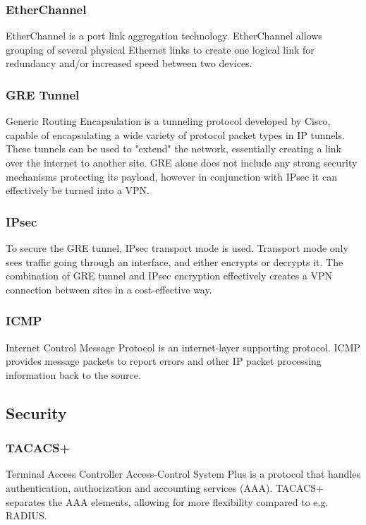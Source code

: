 \subsubsection{EtherChannel}
EtherChannel is a port link aggregation technology. EtherChannel allows grouping of several physical Ethernet links to create one logical link for redundancy and/or increased speed between two devices. \cite{EtherChannel}

\subsubsection{GRE Tunnel}
Generic Routing Encapsulation is a tunneling protocol developed by Cisco, capable of encapsulating a wide variety of protocol packet types in IP tunnels. \cite{CCNP-ROUTE}
These tunnels can be used to "extend" the network, essentially creating a link over the internet to another site.
GRE alone does not include any strong security mechanisms protecting its payload, however in conjunction with IPsec it can effectively be turned into a VPN.

\subsubsection{IPsec}
To secure the GRE tunnel, IPsec transport mode is used.
Transport mode only sees traffic going through an interface, and either encrypts or decrypts it. 
The combination of GRE tunnel and IPsec encryption effectively creates a VPN connection between sites in a cost-effective way.

\subsubsection{ICMP}
Internet Control Message Protocol is an internet-layer supporting protocol.
ICMP provides message packets to report errors and other IP packet processing information back to the source. \cite{ICMP}

\subsection{Security}

\subsubsection{TACACS+}
Terminal Access Controller Access-Control System Plus is a protocol that handles authentication, authorization and accounting services (AAA).
TACACS+ separates the AAA elements, allowing for more flexibility compared to e.g. RADIUS.
\cite{TACACS+}

